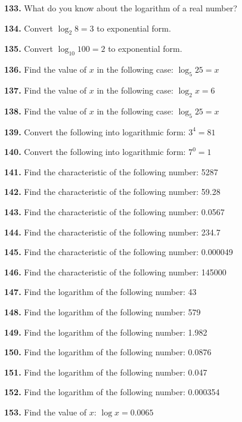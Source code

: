 \documentclass[11pt]{article}
\begin{document}
\bigskip
\noindent\textbf{133.} What do you know about the logarithm of a real number?

\bigskip
\noindent\textbf{134.} Convert $\log_2 8=3$ to exponential form.

\bigskip
\noindent\textbf{135.} Convert $\log_{10} 100=2$ to exponential form.

\bigskip
\noindent\textbf{136.} Find the value of $x$ in the following case: $\log_5 25=x$

\bigskip
\noindent\textbf{137.} Find the value of $x$ in the following case: $\log_2 x=6$

\bigskip
\noindent\textbf{138.} Find the value of $x$ in the following case: $\log_5 25=x$

\bigskip
\noindent\textbf{139.} Convert the following into logarithmic form: $3^4=81$

\bigskip
\noindent\textbf{140.} Convert the following into logarithmic form: $7^0=1$

\bigskip
\noindent\textbf{141.} Find the characteristic of the following number: 5287

\bigskip
\noindent\textbf{142.} Find the characteristic of the following number: 59.28

\bigskip
\noindent\textbf{143.} Find the characteristic of the following number: 0.0567

\bigskip
\noindent\textbf{144.} Find the characteristic of the following number: 234.7

\bigskip
\noindent\textbf{145.} Find the characteristic of the following number: 0.000049

\bigskip
\noindent\textbf{146.} Find the characteristic of the following number: 145000

\bigskip
\noindent\textbf{147.} Find the logarithm of the following number: 43

\bigskip
\noindent\textbf{148.} Find the logarithm of the following number: 579

\bigskip
\noindent\textbf{149.} Find the logarithm of the following number: 1.982

\bigskip
\noindent\textbf{150.} Find the logarithm of the following number: 0.0876

\bigskip
\noindent\textbf{151.} Find the logarithm of the following number: 0.047

\bigskip
\noindent\textbf{152.} Find the logarithm of the following number: 0.000354

\bigskip
\noindent\textbf{153.} Find the value of $x$: $\log x = 0.0065$
\end{document}
